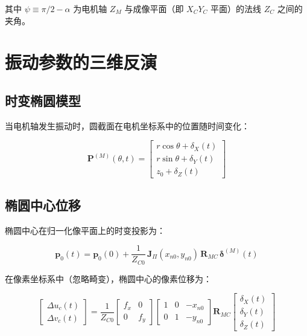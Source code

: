 \documentclass[12pt,a4paper]{article}
\begin{document}
其中 $\psi \equiv \pi/2 - \alpha$ 为电机轴 $Z_M$ 与成像平面（即 $X_CY_C$ 平面）的法线 $Z_C$ 之间的夹角。

\section{振动参数的三维反演}

\subsection{时变椭圆模型}

当电机轴发生振动时，圆截面在电机坐标系中的位置随时间变化：

\begin{equation}
\mathbf{P}^{(M)}(\theta, t) =
\begin{bmatrix}
r\cos\theta + \delta_X(t) \\[2pt]
r\sin\theta + \delta_Y(t) \\[2pt]
z_0 + \delta_Z(t)
\end{bmatrix}
\label{eq:time_varying_circle}
\end{equation}

\subsection{椭圆中心位移}

椭圆中心在归一化像平面上的时变投影为：

\begin{equation}
\mathbf{p}_0(t) = \mathbf{p}_0(0) + \frac{1}{Z_{C0}} \,
\mathbf{J}_{\Pi}(x_{n0}, y_{n0}) \,
\mathbf{R}_{MC} \,
\boldsymbol{\delta}^{(M)}(t)
\label{eq:ellipse_center_motion}
\end{equation}

在像素坐标系中（忽略畸变），椭圆中心的像素位移为：

\begin{equation}
\boxed{
\begin{bmatrix}
\Delta u_c(t) \\[2pt] \Delta v_c(t)
\end{bmatrix}
=
\frac{1}{Z_{C0}}
\begin{bmatrix}
f_x & 0 \\
0   & f_y
\end{bmatrix}
\begin{bmatrix}
1 & 0 & -x_{n0} \\
0 & 1 & -y_{n0}
\end{bmatrix}
\mathbf{R}_{MC}
\begin{bmatrix}
\delta_X(t) \\[2pt] \delta_Y(t) \\[2pt] \delta_Z(t)
\end{bmatrix}
}
\label{eq:ellipse_center_pixel}
\end{equation}
\end{document}
